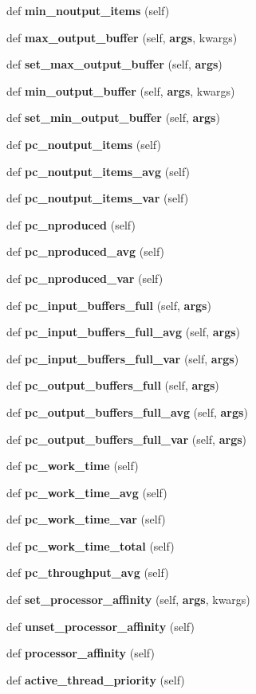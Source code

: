\begin{DoxyCompactItemize}
def {\bf min\+\_\+noutput\+\_\+items} (self)
\item 
def {\bf max\+\_\+output\+\_\+buffer} (self, {\bf args}, kwargs)
\item 
def {\bf set\+\_\+max\+\_\+output\+\_\+buffer} (self, {\bf args})
\item 
def {\bf min\+\_\+output\+\_\+buffer} (self, {\bf args}, kwargs)
\item 
def {\bf set\+\_\+min\+\_\+output\+\_\+buffer} (self, {\bf args})
\item 
def {\bf pc\+\_\+noutput\+\_\+items} (self)
\item 
def {\bf pc\+\_\+noutput\+\_\+items\+\_\+avg} (self)
\item 
def {\bf pc\+\_\+noutput\+\_\+items\+\_\+var} (self)
\item 
def {\bf pc\+\_\+nproduced} (self)
\item 
def {\bf pc\+\_\+nproduced\+\_\+avg} (self)
\item 
def {\bf pc\+\_\+nproduced\+\_\+var} (self)
\item 
def {\bf pc\+\_\+input\+\_\+buffers\+\_\+full} (self, {\bf args})
\item 
def {\bf pc\+\_\+input\+\_\+buffers\+\_\+full\+\_\+avg} (self, {\bf args})
\item 
def {\bf pc\+\_\+input\+\_\+buffers\+\_\+full\+\_\+var} (self, {\bf args})
\item 
def {\bf pc\+\_\+output\+\_\+buffers\+\_\+full} (self, {\bf args})
\item 
def {\bf pc\+\_\+output\+\_\+buffers\+\_\+full\+\_\+avg} (self, {\bf args})
\item 
def {\bf pc\+\_\+output\+\_\+buffers\+\_\+full\+\_\+var} (self, {\bf args})
\item 
def {\bf pc\+\_\+work\+\_\+time} (self)
\item 
def {\bf pc\+\_\+work\+\_\+time\+\_\+avg} (self)
\item 
def {\bf pc\+\_\+work\+\_\+time\+\_\+var} (self)
\item 
def {\bf pc\+\_\+work\+\_\+time\+\_\+total} (self)
\item 
def {\bf pc\+\_\+throughput\+\_\+avg} (self)
\item 
def {\bf set\+\_\+processor\+\_\+affinity} (self, {\bf args}, kwargs)
\item 
def {\bf unset\+\_\+processor\+\_\+affinity} (self)
\item 
def {\bf processor\+\_\+affinity} (self)
\item 
def {\bf active\+\_\+thread\+\_\+priority} (self)

\end{DoxyCompactItemize}
